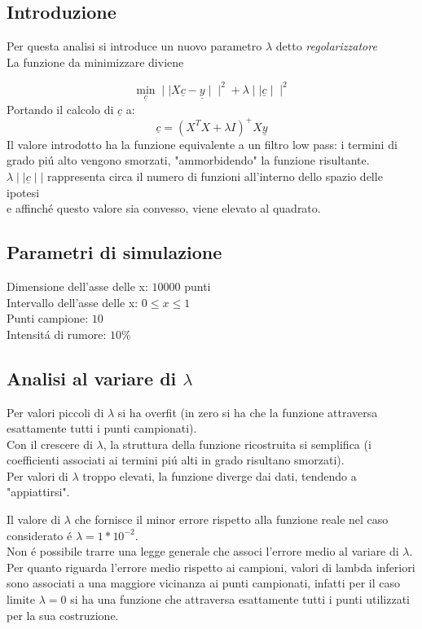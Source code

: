 \documentclass[12pt]{article}
\begin{document}
\subsection{Introduzione}

Per questa analisi si introduce un nuovo parametro $\lambda$ detto \textit{regolarizzatore} \\
La funzione da minimizzare diviene

$$
  \underset{\underline{c}}{\min} \mid \mid X \underline{c} - \underline{y} \mid \mid^2 + \lambda \mid \mid \underline{c} \mid \mid^2
$$
Portando il calcolo di $ \underline{c} $ a:
$$
  \underline{c} = (X^T X + \lambda I)^+ X \underline{y}
$$
Il valore introdotto ha la funzione equivalente a un filtro low pass:
i termini di grado piú alto vengono smorzati, "ammorbidendo" la funzione risultante. \\
$\lambda \mid \mid \underline{c} \mid \mid$ rappresenta circa il numero di funzioni all'interno dello spazio delle ipotesi \\
e affinché questo valore sia convesso, viene elevato al quadrato.

\subsection{Parametri di simulazione}

Dimensione dell'asse delle x: $10000$ punti \\
Intervallo dell'asse delle x: $0 \leq x \leq 1$ \\
Punti campione: $10$ \\
Intensitá di rumore: $10\%$

\subsection{Analisi al variare di $\lambda$}

Per valori piccoli di $\lambda$ si ha overfit (in zero si ha che la funzione attraversa esattamente tutti i punti campionati). \\
Con il crescere di $\lambda$, la struttura della funzione ricostruita si semplifica (i coefficienti associati ai termini piú alti in grado risultano smorzati). \\
Per valori di $\lambda$ troppo elevati, la funzione diverge dai dati, tendendo a "appiattirsi".

Il valore di $\lambda$ che fornisce il minor errore rispetto alla funzione reale nel caso
considerato é $\lambda=1*10^{-2}$. \\
Non é possibile trarre una legge generale che associ l'errore medio al variare di $\lambda$.
Per quanto riguarda l'errore medio rispetto ai campioni, valori di lambda inferiori sono associati
a una maggiore vicinanza ai punti campionati, infatti per il caso limite $\lambda=0$ si ha una funzione che
attraversa esattamente tutti i punti utilizzati per la sua costruzione.
\end{document}
